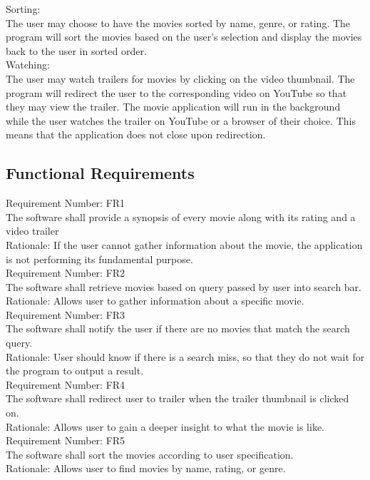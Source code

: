\documentclass[12pt, titlepage]{article}
\begin{document}
Sorting:\\
The user may choose to have the movies sorted by name, genre, or rating. The program will sort the movies based on the user’s selection and display the movies back to the user in sorted order.\\

Watching:\\
The user may watch trailers for movies by clicking on the video thumbnail. The program will redirect the user to the corresponding video on YouTube so that they may view the trailer. The movie application will run in the background while the user watches the trailer on YouTube or a browser of their choice. This means that the application does not close upon redirection.\\

\subsection{Functional Requirements}
Requirement Number: FR1\\
The software shall provide a synopsis of every movie along with its rating and a video trailer\\
Rationale: If the user cannot gather information about the movie, the application is not performing its fundamental purpose.\\

Requirement Number: FR2\\
The software shall retrieve movies based on query passed by user into search bar.\\
Rationale: Allows user to gather information about a specific movie.\\

Requirement Number: FR3\\
The software shall notify the user if there are no movies that match the search query.\\
Rationale: User should know if there is a search miss, so that they do not wait for the program to output a result.\\

Requirement Number: FR4\\
The software shall redirect user to trailer when the trailer thumbnail is clicked on.\\
Rationale: Allows user to gain a deeper insight to what the movie is like.\\

Requirement Number: FR5\\
The software shall sort the movies according to user specification.\\
Rationale: Allows user to find movies by name, rating, or genre.\\
\end{document}
